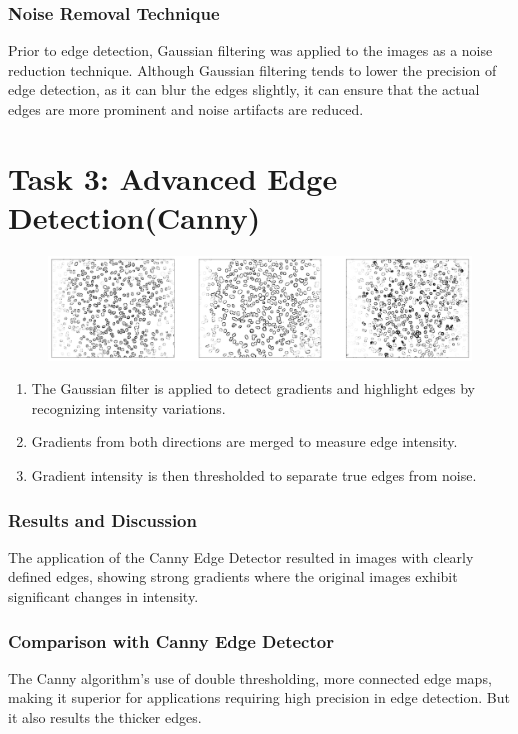 \documentclass[11pt]{article}
\begin{document}
\subsubsection*{Noise Removal Technique}
Prior to edge detection, Gaussian filtering was applied to the images as a noise reduction technique. Although Gaussian filtering tends to lower the precision of edge detection, as it can blur the edges slightly, it can ensure that the actual edges are more prominent and noise artifacts are reduced. 

\section*{Task 3: Advanced Edge Detection(Canny)}

\begin{figure}[h]
    \centering
    \includegraphics[width=\textwidth]{../img/task3_canny.png}
\end{figure}

\begin{enumerate}
    \item The Gaussian filter is applied to detect gradients and highlight edges by recognizing intensity variations.
    \item Gradients from both directions are merged to measure edge intensity.
    \item Gradient intensity is then thresholded to separate true edges from noise.
\end{enumerate}

\subsubsection*{Results and Discussion}
The application of the Canny Edge Detector resulted in images with clearly defined edges, showing strong gradients where the original images exhibit significant changes in intensity. 

\subsubsection*{Comparison with Canny Edge Detector}
The Canny algorithm's use of double thresholding, more connected edge maps, making it superior for applications requiring high precision in edge detection. But it also results the thicker edges.
\end{document}

